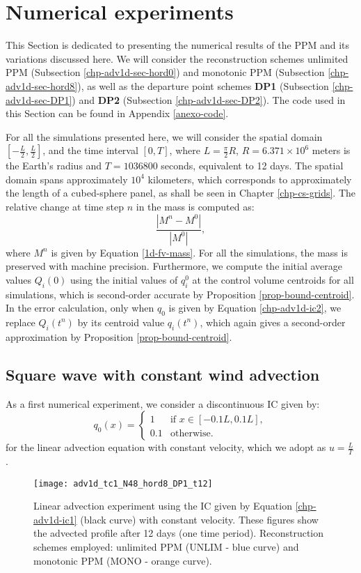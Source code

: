 \section{Numerical experiments}
\label{chp-adv1d-sec-numerical-exp}
This Section is dedicated to presenting the numerical results of the PPM and 
its variations discussed here. We will consider the reconstruction
schemes unlimited PPM  (Subsection \ref{chp-adv1d-sec-hord0}) and monotonic PPM
(Subsection \ref{chp-adv1d-sec-hord8}), as well as the departure point schemes
\textbf{DP1} (Subsection \ref{chp-adv1d-sec-DP1}) and \textbf{DP2} (Subsection \ref{chp-adv1d-sec-DP2}).
The code used in this Section can be found in Appendix \ref{anexo-code}.

For all the simulations presented here, we will consider the spatial domain $[-\frac{L}{2},\frac{L}{2}]$,
and the time interval $[0,T]$,  where $L = \frac{\pi}{2} R$, $R = 6.371 \times 10^{6}$ meters is the Earth's radius and
$T = 1036800$ seconds, equivalent to 12 days.
The spatial domain spans approximately $10^4$ kilometers, which corresponds to approximately the length of a cubed-sphere panel,
as shall be seen in Chapter \ref{chp-cs-grids}.
The relative change at time step $n$ in the mass is computed as:
\begin{equation*}
	\frac{|M^n-M^0|}{|M^0|},
\end{equation*}
where $M^n$ is given by Equation \eqref{1d-fv-mass}.
For all the simulations, the
mass is preserved with machine precision. Furthermore,
we compute the initial average values $Q_i(0)$ using
the initial values of $q^0_i$ at the control volume centroids for all simulations,
which is second-order accurate by Proposition \ref{prop-bound-centroid}. 
In the error calculation, only when $q_0$ is given by Equation \eqref{chp-adv1d-ic2},
we replace $Q_{i}(t^n)$ by its centroid value $q_{i}(t^n)$, which again gives
a second-order approximation by Proposition \ref{prop-bound-centroid}.

\subsection{Square wave with constant wind advection}
\label{chp-adv1d-sec-numerical-exp-1}
As a first numerical experiment, we consider
a discontinuous IC given by:
\begin{equation}
	\label{chp-adv1d-ic1}
		q_0(x) =  
  \begin{cases}
		1 & \text{if } x \in [-0.1L,0.1L],\\
		0.1 & \text{otherwise}.
  \end{cases}
\end{equation}
for the linear advection equation with constant velocity, which we adopt as $u=\frac{L}{T}$.
\begin{figure}[!htb]
	\centering
	\texttt{[image: adv1d\_tc1\_N48\_hord8\_DP1\_t12]}
	\caption{Linear advection experiment using the IC given by Equation \eqref{chp-adv1d-ic1} (black curve) with constant velocity.
		These figures show the advected profile after 12 days (one time period).
		Reconstruction schemes employed: unlimited PPM (UNLIM - blue curve) and monotonic PPM (MONO - orange curve).\label{chp-adv1d-sec-exp-adv1}}
\end{figure}

